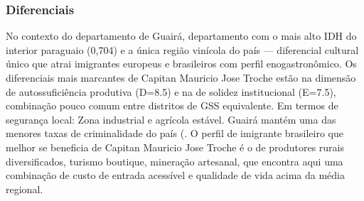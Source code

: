 \subsubsection*{Diferenciais}\label{dif-capitan-mauricio-jose-troche-0403}
No contexto do departamento de Guairá, departamento com o mais alto IDH do interior paraguaio (0,704) e a única região vinícola do país — diferencial cultural único que atrai imigrantes europeus e brasileiros com perfil enogastronômico. Os diferenciais mais marcantes de Capitan Mauricio Jose Troche estão na dimensão de autossuficiência produtiva (D=8.5) e na de solidez institucional (E=7.5), combinação pouco comum entre distritos de GSS equivalente. Em termos de segurança local: Zona industrial e agrícola estável. Guairá mantém uma das menores taxas de criminalidade do país (. O perfil de imigrante brasileiro que melhor se beneficia de Capitan Mauricio Jose Troche é o de produtores rurais diversificados, turismo boutique, mineração artesanal, que encontra aqui uma combinação de custo de entrada acessível e qualidade de vida acima da média regional.
